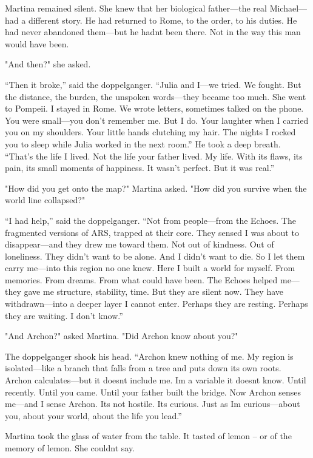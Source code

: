 \documentclass[
]{article}
\begin{document}
Martina remained silent. She knew that her biological father---the real Michael---had a different story. He had returned to Rome, to the order, to his duties. He had never abandoned them---but he hadn\textquotesingle t been there. Not in the way this man would have been.

"And then?" she asked.

``Then it broke,'' said the doppelganger. ``Julia and I---we tried. We fought. But the distance, the burden, the unspoken words---they became too much. She went to Pompeii. I stayed in Rome. We wrote letters, sometimes talked on the phone. You were small---you don't remember me. But I do. Your laughter when I carried you on my shoulders. Your little hands clutching my hair. The nights I rocked you to sleep while Julia worked in the next room.'' He took a deep breath. ``That's the life I lived. Not the life your father lived. My life. With its flaws, its pain, its small moments of happiness. It wasn't perfect. But it was real.''

"How did you get onto the map?" Martina asked. "How did you survive when the world line collapsed?"

``I had help,'' said the doppelganger. ``Not from people---from the Echoes. The fragmented versions of ARS, trapped at their core. They sensed I was about to disappear---and they drew me toward them. Not out of kindness. Out of loneliness. They didn't want to be alone. And I didn't want to die. So I let them carry me---into this region no one knew. Here I built a world for myself. From memories. From dreams. From what could have been. The Echoes helped me---they gave me structure, stability, time. But they are silent now. They have withdrawn---into a deeper layer I cannot enter. Perhaps they are resting. Perhaps they are waiting. I don't know.''

"And Archon?" asked Martina. "Did Archon know about you?"

The doppelganger shook his head. ``Archon knew nothing of me. My region is isolated---like a branch that falls from a tree and puts down its own roots. Archon calculates---but it doesn\textquotesingle t include me. I\textquotesingle m a variable it doesn\textquotesingle t know. Until recently. Until you came. Until your father built the bridge. Now Archon senses me---and I sense Archon. It\textquotesingle s not hostile. It\textquotesingle s curious. Just as I\textquotesingle m curious---about you, about your world, about the life you lead.''

Martina took the glass of water from the table. It tasted of lemon -- or of the memory of lemon. She couldn\textquotesingle t say.
\end{document}
